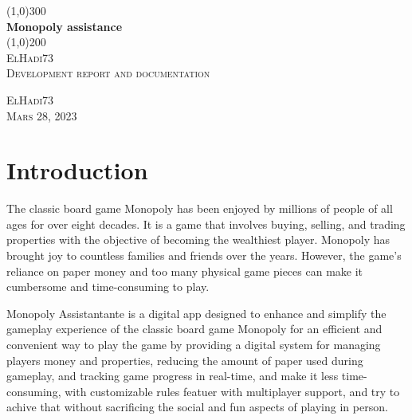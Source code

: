 \documentclass{article}
\begin{document}
\begin{titlepage}
	\begin{center}
		\line(1,0){300}\\
		[0.25in]
		\huge{\bfseries Monopoly assistance}\\
		[2mm]
		\line(1,0){200}\\
		[1.5cm]
		\textsc{\LARGE ElHadi73}\\
		[0.75cm]
		\textsc{\Large Development report and documentation}\\
		[10cm]
	\end{center}
	\begin{flushright}
		\textsc{\large ElHadi73\\
		Mars 28, 2023\\}
	\end{flushright}
\end{titlepage}


\cleardoublepage
\tableofcontents
\thispagestyle{empty}
\cleardoublepage


\setcounter{page}{1}

\section{Introduction}\label{sec:intro}
The classic board game Monopoly has been enjoyed by millions of people of all ages for over eight decades. It is a game that involves buying, selling, and trading properties with the objective of becoming the wealthiest
player. Monopoly has brought joy to countless families and friends over the years. However, the game's reliance on paper money and too many physical game pieces can make it cumbersome and time-consuming to play.

Monopoly Assistantante is a digital app designed to enhance and simplify the gameplay experience of the classic board game Monopoly for an efficient and convenient way to play the game by providing a digital system for managing players money and properties, reducing the amount of paper used during gameplay, and tracking game progress in real-time, and make it less time-consuming, with customizable rules featuer with multiplayer support, and try to achive that without sacrificing the social and fun aspects of playing in person. 
\end{document}
